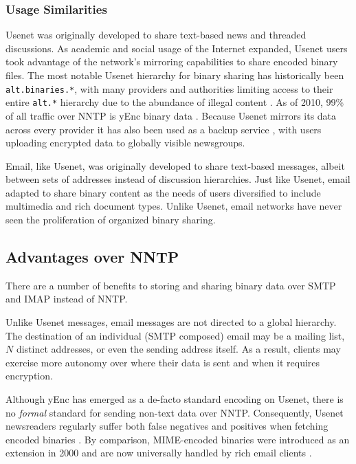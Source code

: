 \documentclass[12pt]{article}
\begin{document}
\subsubsection{Usage Similarities}

Usenet was originally developed to share text-based news and threaded
discussions. As academic and social usage of the Internet expanded,
Usenet users took advantage of the network's mirroring capabilities to share
encoded binary files. The most notable Usenet hierarchy for binary sharing
has historically been \texttt{alt.binaries.*}, with many providers and
authorities limiting access to their entire \texttt{alt.*} hierarchy due to the
abundance of illegal content \cite{cnet2008:01, cnet2008:02}. As of 2010,
99\% of all traffic over NNTP is yEnc binary data \cite{gi2010}.
Because Usenet mirrors its data across every provider it has
also been used as a backup service \cite{ubackup}, with users uploading
encrypted data to globally visible newsgroups.

Email, like Usenet, was originally developed to share text-based messages,
albeit between sets of addresses instead of discussion hierarchies.
Just like Usenet, email adapted to share binary content as the needs of users
diversified to include multimedia and rich document types. Unlike Usenet, email
networks have never seen the proliferation of organized binary sharing.

\subsection{Advantages over NNTP}

There are a number of benefits to storing and sharing binary data over SMTP
and IMAP instead of NNTP.

Unlike Usenet messages, email messages are not directed to a global hierarchy.
The destination of an individual (SMTP composed) email may be a mailing list,
$N$ distinct addresses, or even the sending address itself. As a result, clients
may exercise more autonomy over where their data is sent and when it requires
encryption.

Although yEnc has emerged as a de-facto standard \cite{gi2010} encoding on
Usenet, there is no \textit{formal} standard for sending non-text data over
NNTP. Consequently, Usenet newsreaders regularly suffer both false negatives
and positives when fetching encoded binaries \cite{claus2002, nixon2002}. By
comparison, MIME-encoded binaries were introduced as an extension in 2000 and
are now universally handled by rich email clients \cite{rfc3030}.
\end{document}
